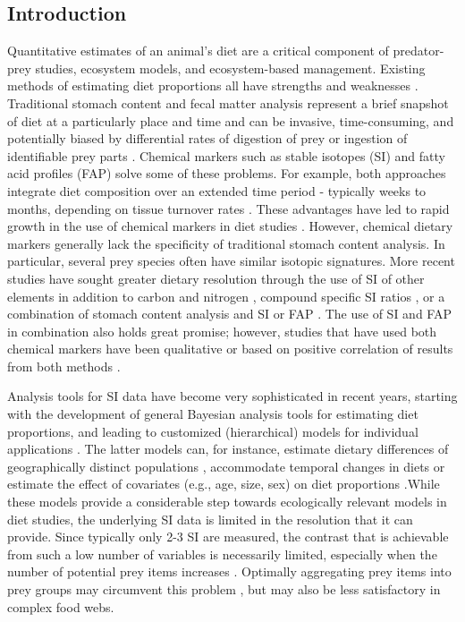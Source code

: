 \documentclass{article}%
\begin{document}
\begin{spacing}{1.9}
\begin{flushleft}
\section{Introduction}
Quantitative estimates of an animal’s diet are a critical component of
predator-prey studies, ecosystem models, and ecosystem-based
management. Existing methods of estimating diet proportions all have
strengths and weaknesses \citep{bowen_methods_2012}. Traditional
stomach content and fecal matter analysis represent a brief snapshot
of diet at a particularly place and time and can be invasive,
time-consuming, and potentially biased by differential rates of
digestion of prey or ingestion of identifiable prey parts
\citep{bowen_methods_2012}. Chemical markers such as stable isotopes
(SI) and fatty acid profiles (FAP) solve some of these problems.  For
example, both approaches integrate diet composition over an extended
time period -  typically weeks to months, depending on tissue turnover
rates  \citep{tucker_convergence_2008}. These advantages have led to rapid
growth in the use of chemical markers in diet studies
 \citep{elsdon_unraveling_2010,williams_using_2010,kelly_fatty_2011,
bowen_methods_2012}. However, chemical dietary markers generally lack
the specificity of traditional stomach content analysis. In
particular, several prey species often have similar isotopic signatures. More
recent studies have sought greater dietary resolution through the use
of SI of other elements in addition to carbon and
nitrogen \citep[e.g.,][]{belicka_stable_2012}, compound specific SI ratios
\citep[e.g.,][]{budge_tracing_2008,jack_individual_2011}, or a combination of stomach
content analysis and SI or FAP \citep[e.g.,][]{pethybridge_seasonal_2012}. The
use of SI and FAP in combination also holds great promise; however, studies that have used both chemical markers have been
qualitative \citep{[e.g.,][]guest_trophic_2009} or based on positive correlation
of results from both methods \citep{tucker_convergence_2008}.

Analysis tools for SI data have become very sophisticated in recent
years, starting with the development of general Bayesian analysis
tools for estimating diet proportions, and leading to customized
(hierarchical) models for individual applications \citep{moore_incorporating_2008,hopkins_estimating_2012,parnell_bayesian_2012}. The latter models
can, for instance, estimate dietary differences of geographically
distinct populations \citep{semmens_quantifying_2009}, accommodate temporal
changes in diets or estimate the effect of covariates (e.g., age,
size, sex) on diet proportions \citep{parnell_bayesian_2012}.While these
models provide a considerable step towards ecologically relevant
models in diet studies, the underlying SI data is limited in the
resolution that it can provide. Since typically only 2-3 SI are
measured, the contrast that is achievable from such a low number of
variables is necessarily limited, especially when the number of
potential prey items increases \citep{phillips_source_2003,ward_quantitative_2011}. Optimally aggregating prey items into prey groups may
circumvent this problem \citep{ward_quantitative_2011}, but may also be less
satisfactory in complex food webs.


\end{flushleft}
\end{spacing}
\end{document}

